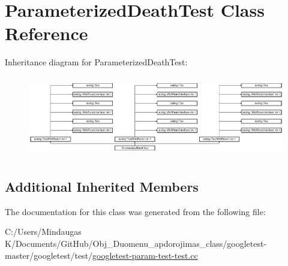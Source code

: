 \hypertarget{class_parameterized_death_test}{}\section{Parameterized\+Death\+Test Class Reference}
\label{class_parameterized_death_test}
Inheritance diagram for Parameterized\+Death\+Test\+:\begin{figure}[H]
\begin{center}
\leavevmode
\includegraphics[height=3.572568cm]{dc/dd4/class_parameterized_death_test}
\end{center}
\end{figure}
\subsection*{Additional Inherited Members}


The documentation for this class was generated from the following file\+:\begin{DoxyCompactItemize}
\item 
C\+:/\+Users/\+Mindaugas K/\+Documents/\+Git\+Hub/\+Obj\+\_\+\+Duomenu\+\_\+apdorojimas\+\_\+class/googletest-\/master/googletest/test/\mbox{\hyperlink{googletest-master_2googletest_2test_2googletest-param-test-test_8cc}{googletest-\/param-\/test-\/test.\+cc}}\end{DoxyCompactItemize}
